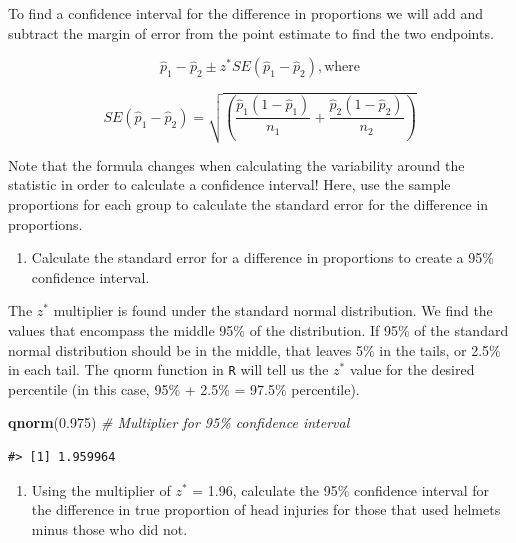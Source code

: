 \documentclass[
]{report}
\newenvironment{Shaded}{\begin{snugshade}}{\end{snugshade}}
\newcommand{\CommentTok}[1]{\textcolor[rgb]{0.56,0.35,0.01}{\textit{#1}}}
\newcommand{\FloatTok}[1]{\textcolor[rgb]{0.00,0.00,0.81}{#1}}
\newcommand{\KeywordTok}[1]{\textcolor[rgb]{0.13,0.29,0.53}{\textbf{#1}}}
\newcommand{\NormalTok}[1]{#1}
\providecommand{\tightlist}{%
  \setlength{\itemsep}{0pt}\setlength{\parskip}{0pt}}
\begin{document}
To find a confidence interval for the difference in proportions we will add and subtract the margin of error from the point estimate to find the two endpoints.

\[\hat{p}_1-\hat{p}_2\pm z^*SE(\hat{p}_1-\hat{p}_2), \text{where}\]

\[SE(\hat{p}_1-\hat{p}_2) = \sqrt{\left(\frac{\hat{p}_1 (1-\hat{p}_1)}{n_1}+\frac{\hat{p}_2 (1-\hat{p}_2)}{n_2}\right)}\]

Note that the formula changes when calculating the variability around the statistic in order to calculate a confidence interval! Here, use the sample proportions for each group to calculate the standard error for the difference in proportions.

\begin{enumerate}
\def\labelenumi{\arabic{enumi}.}
\setcounter{enumi}{21}
\tightlist
\item
  Calculate the standard error for a difference in proportions to create a 95\% confidence interval.
\end{enumerate}

\vspace{1in}

The \(z^*\) multiplier is found under the standard normal distribution. We find the values that encompass the middle 95\% of the distribution. If 95\% of the standard normal distribution should be in the middle, that leaves 5\% in the tails, or 2.5\% in each tail. The qnorm function in \texttt{R} will tell us the \(z^*\) value for the desired percentile (in this case, 95\% + 2.5\% = 97.5\% percentile).

\begin{Shaded}
\begin{Highlighting}[]
\KeywordTok{qnorm}\NormalTok{(}\FloatTok{0.975}\NormalTok{) }\CommentTok{\# Multiplier for 95\% confidence interval}
\end{Highlighting}
\end{Shaded}

\begin{verbatim}
#> [1] 1.959964
\end{verbatim}

\begin{enumerate}
\def\labelenumi{\arabic{enumi}.}
\setcounter{enumi}{22}
\tightlist
\item
  Using the multiplier of \(z^*\) = 1.96, calculate the 95\% confidence interval for the difference in true proportion of head injuries for those that used helmets minus those who did not.
\end{enumerate}
\end{document}
